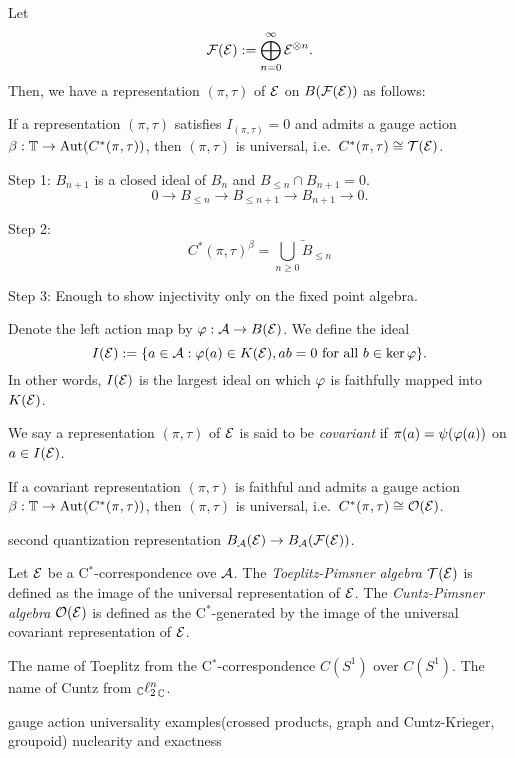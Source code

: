 \documentclass{../../../small}
\begin{document}
\begin{defn}
Let
\[\mathcal{F}(\mathcal{E}):=\bigoplus_{n=0}^\infty\mathcal{E}^{\otimes n}.\]
Then, we have a representation $(\pi,\tau)$ of $\mathcal{E}$ on $B(\mathcal{F}(\mathcal{E}))$ as follows:
\end{defn}


\begin{thm}
If a representation $(\pi,\tau)$ satisfies $I_{(\pi,\tau)}=0$ and admits a gauge action $\beta:\mathbb{T}\to\operatorname{Aut}(C^*(\pi,\tau))$, then $(\pi,\tau)$ is universal, i.e.~$C^*(\pi,\tau)\cong\mathcal{T}(\mathcal{E})$.
\end{thm}
\begin{pf}[Sketch]
Step 1: $B_{n+1}$ is a closed ideal of $B_n$ and $B_{\le n}\cap B_{n+1}=0$.
\[0\to B_{\le n}\to B_{\le n+1}\to B_{n+1}\to0.\]

Step 2:
\[C^*(\pi,\tau)^\beta=\bar{\bigcup_{n\ge0} B_{\le n}}\]

Step 3: Enough to show injectivity only on the fixed point algebra.
\end{pf}






\bigskip

Denote the left action map by $\varphi:\mathcal{A}\to B(\mathcal{E})$.
We define the ideal
\[I(\mathcal{E}):=\{a\in\mathcal{A}:\varphi(a)\in K(\mathcal{E}), ab=0\text{ for all }b\in\ker\varphi\}.\]
In other words, $I(\mathcal{E})$ is the largest ideal on which $\varphi$ is faithfully mapped into $K(\mathcal{E})$.

\begin{defn}
We say a representation $(\pi,\tau)$ of $\mathcal{E}$ is said to be \emph{covariant} if $\pi(a)=\psi(\varphi(a))$ on $a\in I(\mathcal{E})$.
\end{defn}
\begin{thm}
If a covariant representation $(\pi,\tau)$ is faithful and admits a gauge action $\beta:\mathbb{T}\to\operatorname{Aut}(C^*(\pi,\tau))$, then $(\pi,\tau)$ is universal, i.e.~$C^*(\pi,\tau)\cong\mathcal{O}(\mathcal{E})$.
\end{thm}

second quantization representation $B_{\mathcal{A}}(\mathcal{E})\to B_{\mathcal{A}}(\mathcal{F}(\mathcal{E}))$.

\begin{defn}
Let $\mathcal{E}$ be a C$^*$-correspondence ove $\mathcal{A}$.
The \emph{Toeplitz-Pimsner algebra} $\mathcal{T}(\mathcal{E})$ is defined as the image of the universal representation of $\mathcal{E}$.
The \emph{Cuntz-Pimsner algebra} $\mathcal{O}(\mathcal{E})$ is defined as the C$^*$-generated by the image of the universal covariant representation of $\mathcal{E}$.
\end{defn}

The name of Toeplitz from the C$^*$-correspondence $C(S^1)$ over $C(S^1)$.
The name of Cuntz from $_{\mathbb{C}}{\ell_2^n}_{\mathbb{C}}$.



gauge action
universality
examples(crossed products, graph and Cuntz-Krieger, groupoid)
nuclearity and exactness
\end{document}

